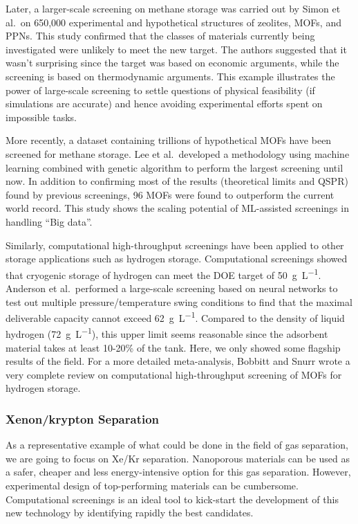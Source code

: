 \documentclass[main.tex]{subfiles}
\begin{document}
Later, a larger-scale screening on methane storage was carried out by Simon et al.\ on 650,000 experimental and hypothetical structures of zeolites, MOFs, and PPNs. This study confirmed that the classes of materials currently being investigated were unlikely to meet the new target. The authors suggested that it wasn't surprising since the target was based on economic arguments, while the screening is based on thermodynamic arguments.\cite{Simon_2015_EES} This example illustrates the power of large-scale screening to settle questions of physical feasibility (if simulations are accurate) and hence avoiding experimental efforts spent on impossible tasks.

More recently, a dataset containing trillions of hypothetical MOFs have been screened for methane storage.\cite{Lee_2021} Lee et al.\ developed a methodology using machine learning combined with genetic algorithm to perform the largest screening until now. In addition to confirming most of the results (theoretical limits and QSPR) found by previous screenings, 96 MOFs were found to outperform the current world record. This study shows the scaling potential of ML-assisted screenings in handling ``Big data''.

Similarly, computational high-throughput screenings have been applied to other storage applications such as hydrogen storage. Computational screenings showed that cryogenic storage of hydrogen can meet the DOE target of \SI{50}{\gram\per\liter}.\cite{Gomez_Gualdron_2016, Bobbitt_2016, Thornton_2017} Anderson et al.\ performed a large-scale screening based on neural networks to test out multiple pressure/temperature swing conditions to find that the maximal deliverable capacity cannot exceed \SI{62}{\gram\per\liter}.\cite{Anderson_2018} Compared to the density of liquid hydrogen (\SI{72}{\gram\per\liter}), this upper limit seems reasonable since the adsorbent material takes at least {10-20\%} of the tank. Here, we only showed some flagship results of the field. For a more detailed meta-analysis, Bobbitt and Snurr wrote a very complete review on computational high-throughput screening of MOFs for hydrogen storage.\cite{Bobbitt_2019}

\subsubsection{Xenon/krypton Separation}

As a representative example of what could be done in the field of gas separation, we are going to focus on Xe/Kr separation. Nanoporous materials can be used as a safer, cheaper and less energy-intensive option for this gas separation. However, experimental design of top-performing materials can be cumbersome. Computational screenings is an ideal tool to kick-start the development of this new technology by identifying rapidly the best candidates.
\end{document}
